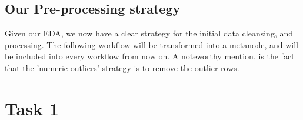 \documentclass[11pt]{article}
\begin{document}
		\subsection*{Our Pre-processing strategy}
			Given  our EDA, we now have a clear strategy for the initial data cleansing, and processing. The following workflow will be transformed into a metanode, and will be included into every workflow from now on. A noteworthy mention, is the fact that the 'numeric outliers' strategy is to remove the outlier rows.

			

	\section*{Task 1}
\end{document}
